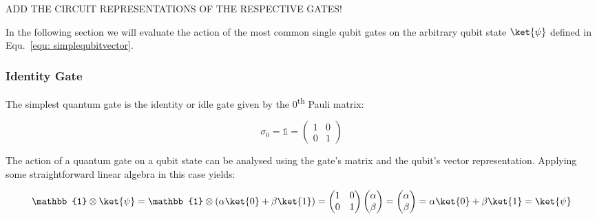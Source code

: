 ADD THE CIRCUIT REPRESENTATIONS OF THE RESPECTIVE GATES!

In the following section we will evaluate the action of the most common single qubit gates on the arbitrary qubit state $\ket{\psi}$ defined in Equ.~\ref{equ: simplequbitvector}.



\subsubsection{Identity Gate}
\label{subsubsubsec:identitygate}

The simplest quantum gate is the identity or idle gate given by the 0\textsuperscript{th} Pauli matrix:

\begin{equation}
\sigma_{0} = \mathbb{1} = \begin{pmatrix}
 1 & 0 \\ 
 0 & 1
 \end{pmatrix}
\end{equation}

The action of a quantum gate on a qubit state can be analysed using the gate's matrix and the qubit's vector representation. Applying some straightforward linear algebra in this case yields:

\begin{equation}
\label{equ:identityverification}
\mathbb{1} \otimes \ket{\psi} = \mathbb{1} \otimes (\alpha \ket{0} + \beta \ket{1}) = \begin{pmatrix}
 1 & 0 \\ 
 0 & 1
 \end{pmatrix} \begin{pmatrix}
 \alpha  \\ 
 \beta
 \end{pmatrix} = \begin{pmatrix}
 \alpha  \\ 
 \beta
 \end{pmatrix} = \alpha \ket{0} + \beta \ket{1} = \ket{\psi}
\end{equation}

